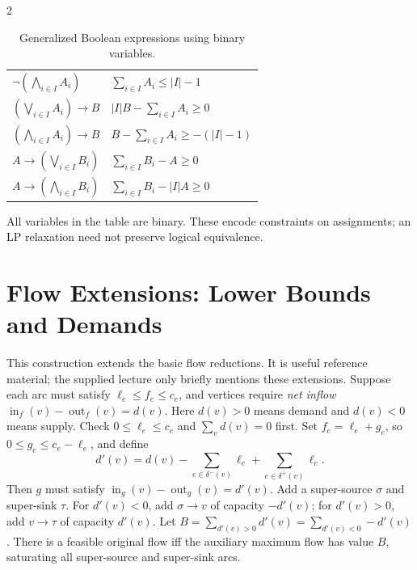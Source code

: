 \documentclass[10pt]{article}
\theoremstyle{definition}
\begin{document}
\begin{multicols*}{2}
\begin{table}[H]
\begin{tabular}{l l}
$\displaystyle \neg\left(\bigwedge_{i\in I} A_i\right)$
&
$\displaystyle \sum_{i\in I} A_i \le |I|-1$
\\[6pt]

$\displaystyle
\left(\bigvee_{i\in I} A_i\right)\rightarrow B$
&
$\displaystyle
|I|B-\sum_{i\in I}A_i \ge 0$
\\[6pt]

$\displaystyle
\left(\bigwedge_{i\in I} A_i\right)\rightarrow B$
&
$\displaystyle
B-\sum_{i\in I}A_i \ge -( |I|-1)$
\\[6pt]

$\displaystyle
A\rightarrow\left(\bigvee_{i\in I}B_i\right)$
&
$\displaystyle
\sum_{i\in I}B_i-A\ge0$
\\[6pt]

$\displaystyle
A\rightarrow\left(\bigwedge_{i\in I}B_i\right)$
&
$\displaystyle
\sum_{i\in I}B_i-|I|A\ge0$
\\

\hline
\end{tabular}

\caption{Generalized Boolean expressions using binary variables.}
\end{table}

All variables in the table are binary. These encode constraints on assignments; an LP relaxation need not preserve logical equivalence.


\clearpage

\section{Flow Extensions: Lower Bounds and Demands}\label{nf:demands}
This construction extends the basic flow reductions. It is useful reference
material; the supplied lecture only briefly mentions these extensions.
Suppose each arc must satisfy $\ell_e\le f_e\le c_e$, and vertices require
\emph{net inflow} $\operatorname{in}_f(v)-\operatorname{out}_f(v)=d(v)$.
Here $d(v)>0$ means demand and $d(v)<0$ means supply. Check
$0\le\ell_e\le c_e$ and $\sum_v d(v)=0$ first.
Set $f_e=\ell_e+g_e$, so $0\le g_e\le c_e-\ell_e$, and define
\[
 d'(v)=d(v)-\sum_{e\in\delta^-(v)}\ell_e
                  +\sum_{e\in\delta^+(v)}\ell_e.
\]
Then $g$ must satisfy $\operatorname{in}_g(v)-\operatorname{out}_g(v)=d'(v)$.
Add a super-source $\sigma$ and super-sink $\tau$. For $d'(v)<0$, add
$\sigma\to v$ of capacity $-d'(v)$; for $d'(v)>0$, add $v\to\tau$ of
capacity $d'(v)$. Let
$B=\sum_{d'(v)>0}d'(v)=\sum_{d'(v)<0}-d'(v)$.
There is a feasible original flow iff the auxiliary maximum flow has value
$B$, saturating all super-source and super-sink arcs.


\end{multicols*}
\end{document}
